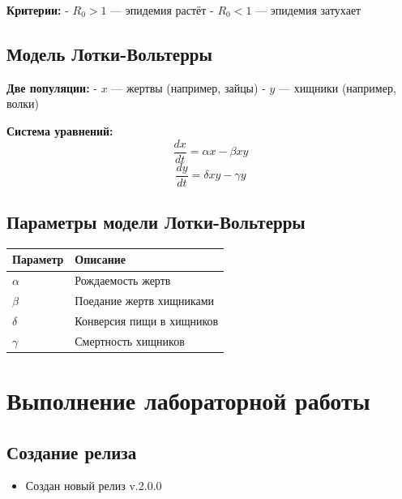 \documentclass[
  letterpaper,
  DIV=11,
  numbers=noendperiod]{scrartcl}
\providecommand{\tightlist}{%
  \setlength{\itemsep}{0pt}\setlength{\parskip}{0pt}}\usepackage{longtable,booktabs,array}
\begin{document}
\textbf{Критерии:} - \(R_0 > 1\) --- эпидемия растёт - \(R_0 < 1\) ---
эпидемия затухает

\subsection{Модель
Лотки-Вольтерры}\label{ux43cux43eux434ux435ux43bux44c-ux43bux43eux442ux43aux438-ux432ux43eux43bux44cux442ux435ux440ux440ux44b}

\textbf{Две популяции:} - \(x\) --- жертвы (например, зайцы) - \(y\) ---
хищники (например, волки)

\textbf{Система уравнений:} \[ \frac{dx}{dt} = \alpha x - \beta x y \]
\[ \frac{dy}{dt} = \delta x y - \gamma y \]

\subsection{Параметры модели
Лотки-Вольтерры}\label{ux43fux430ux440ux430ux43cux435ux442ux440ux44b-ux43cux43eux434ux435ux43bux438-ux43bux43eux442ux43aux438-ux432ux43eux43bux44cux442ux435ux440ux440ux44b}

\begin{longtable}[]{@{}ll@{}}
\toprule\noalign{}
Параметр & Описание \\
\midrule\noalign{}
\endhead
\bottomrule\noalign{}
\endlastfoot
\(\alpha\) & Рождаемость жертв \\
\(\beta\) & Поедание жертв хищниками \\
\(\delta\) & Конверсия пищи в хищников \\
\(\gamma\) & Смертность хищников \\
\end{longtable}

\section{Выполнение лабораторной
работы}\label{ux432ux44bux43fux43eux43bux43dux435ux43dux438ux435-ux43bux430ux431ux43eux440ux430ux442ux43eux440ux43dux43eux439-ux440ux430ux431ux43eux442ux44b}

\subsection{Создание
релиза}\label{ux441ux43eux437ux434ux430ux43dux438ux435-ux440ux435ux43bux438ux437ux430}

\begin{itemize}
\tightlist
\item
  Создан новый релиз v.2.0.0
\end{itemize}
\end{document}
